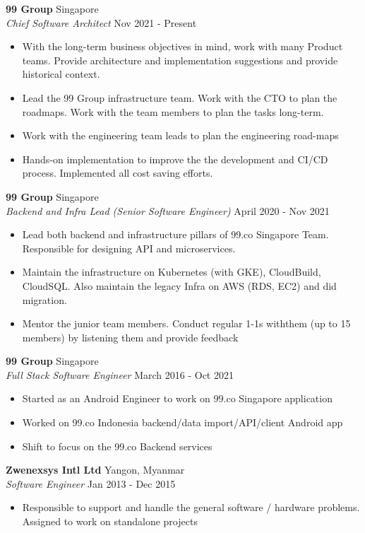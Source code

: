 \documentclass[a4paper]{article}
\begin{document}
\textbf{99 Group} \hfill Singapore\\
\textit{Chief Software Architect} \hfill Nov 2021 - Present\\
\vspace{-1mm}
\begin{itemize} \itemsep 1pt
	\item With the long-term business objectives in mind, work with many Product teams. Provide architecture and implementation suggestions and provide historical context.
	\item Lead the 99 Group infrastructure team. Work with the CTO to plan the roadmaps. Work with the team members to plan the tasks long-term.
	\item Work with the engineering team leads to plan the engineering road-maps
	\item Hands-on implementation to improve the the development and CI/CD process. Implemented all cost saving efforts.
\end{itemize}
\textbf{99 Group} \hfill Singapore\\
\textit{Backend and Infra Lead (Senior Software Engineer)} \hfill April 2020 - Nov 2021\\
\vspace{-1mm}
\begin{itemize} \itemsep 1pt
	\item Lead both backend and infrastructure pillars of 99.co Singapore Team. Responsible for designing API and microservices.
	\item Maintain the infrastructure on Kubernetes (with GKE), CloudBuild, CloudSQL. Also maintain the legacy Infra on AWS (RDS, EC2) and did migration.
	\item Mentor the junior team members. Conduct regular 1-1s withthem (up to 15 members) by listening them and provide feedback
\end{itemize}
\textbf{99 Group} \hfill Singapore\\
\textit{Full Stack Software Engineer} \hfill March 2016 - Oct 2021\\
\vspace{-1mm}
\begin{itemize} \itemsep 1pt
	\item Started as an Android Engineer to work on 99.co Singapore application
	\item Worked on 99.co Indonesia backend/data import/API/client Android app
	\item Shift to focus on the 99.co Backend services
\end{itemize}
\textbf{Zwenexsys Intl Ltd} \hfill Yangon, Myanmar\\
\textit{Software Engineer} \hfill Jan 2013 - Dec 2015\\
\vspace{-1mm}
\begin{itemize} \itemsep 1pt
	\item Responsible to support and handle the general software / hardware problems. Assigned to work on standalone projects
\end{itemize}
\end{document}
